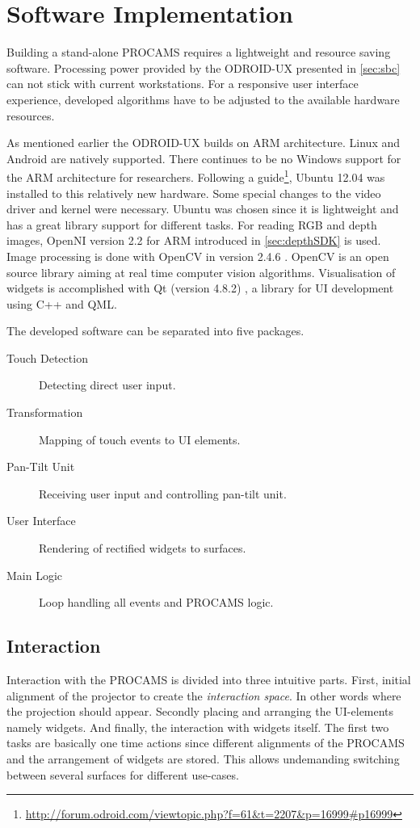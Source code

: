 \chapter{Software Implementation}
Building a stand-alone \acf{PROCAMS} requires a lightweight and resource saving software. Processing power provided by the ODROID-UX presented in \autoref{sec:sbc} can not stick with current workstations. For a responsive user interface experience, developed algorithms have to be adjusted to the available hardware resources.

As mentioned earlier the ODROID-UX builds on ARM architecture. Linux and Android are natively supported. There continues to be no Windows support for the ARM architecture for researchers. Following a guide\footnote{\url{http://forum.odroid.com/viewtopic.php?f=61\&t=2207\&p=16999\#p16999}}, Ubuntu 12.04 was installed to this relatively new hardware. Some special changes to the video driver and kernel were necessary. Ubuntu was chosen since it is lightweight and has a great library support for different tasks.  
For reading RGB and depth images, OpenNI version 2.2 for ARM \cite{Anonymous:5lF7gVK2} introduced in \autoref{sec:depthSDK} is used. Image processing is done with OpenCV in version 2.4.6 \cite{Intel:H9HpU8rd}. OpenCV is an open source library aiming at real time computer vision algorithms. Visualisation of widgets is accomplished with Qt (version 4.8.2) \cite{Digia:BVAEvJrQ}, a library for UI development using C++ and QML. 

The developed software can be separated into five packages.
\begin{description}
\item[Touch Detection] Detecting direct user input.
\item[Transformation] Mapping of touch events to UI elements.
\item[Pan-Tilt Unit] Receiving user input and controlling pan-tilt unit.
\item[User Interface] Rendering of rectified widgets to surfaces.
\item[Main Logic] Loop handling all events and PROCAMS logic.
\end{description}

\section{Interaction}
Interaction with the PROCAMS is divided into three intuitive parts. First, initial alignment of the projector to create the \emph{interaction space}. In other words where the projection should appear. Secondly placing and arranging the UI-elements namely widgets. And finally, the interaction with widgets itself. The first two tasks are basically one time actions since different alignments of the PROCAMS and the arrangement of widgets are stored. This allows undemanding switching between several surfaces for different use-cases.

